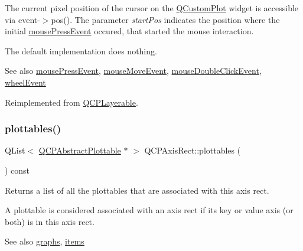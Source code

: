 The current pixel position of the cursor on the \hyperlink{classQCustomPlot}{Q\+Custom\+Plot} widget is accessible via {\ttfamily event-\/$>$pos()}. The parameter {\itshape start\+Pos} indicates the position where the initial \hyperlink{classQCPAxisRect_aa9a7c807eaa4666870ac94aa6abc4dde}{mouse\+Press\+Event} occured, that started the mouse interaction.

The default implementation does nothing.

\begin{DoxySeeAlso}{See also}
\hyperlink{classQCPAxisRect_aa9a7c807eaa4666870ac94aa6abc4dde}{mouse\+Press\+Event}, \hyperlink{classQCPAxisRect_a9cd27ad8c5cfb49aefd9dbb30def4beb}{mouse\+Move\+Event}, \hyperlink{classQCPLayerable_a4171e2e823aca242dd0279f00ed2de81}{mouse\+Double\+Click\+Event}, \hyperlink{classQCPAxisRect_a93eeaa0c127d6d6fe8171b2455080262}{wheel\+Event} 
\end{DoxySeeAlso}


Reimplemented from \hyperlink{classQCPLayerable_aa0d79b005686f668622bbe66ac03ba2c}{Q\+C\+P\+Layerable}.

\mbox{\label{classQCPAxisRect_a587d073a97b27bc7293fab4b2774ad59}} 
\subsubsection{\texorpdfstring{plottables()}{plottables()}}
{\footnotesize\ttfamily Q\+List$<$ \hyperlink{classQCPAbstractPlottable}{Q\+C\+P\+Abstract\+Plottable} $\ast$ $>$ Q\+C\+P\+Axis\+Rect\+::plottables (\begin{DoxyParamCaption}{ }\end{DoxyParamCaption}) const}

Returns a list of all the plottables that are associated with this axis rect.

A plottable is considered associated with an axis rect if its key or value axis (or both) is in this axis rect.

\begin{DoxySeeAlso}{See also}
\hyperlink{classQCPAxisRect_a2d9ded3eca97be1fcb5867949391bb88}{graphs}, \hyperlink{classQCPAxisRect_a03c113a2175448300ee8f944e24776ba}{items} 
\end{DoxySeeAlso}
\mbox{\label{classQCPAxisRect_aae5f99a044ca911685a306f01b7ff941}} 
